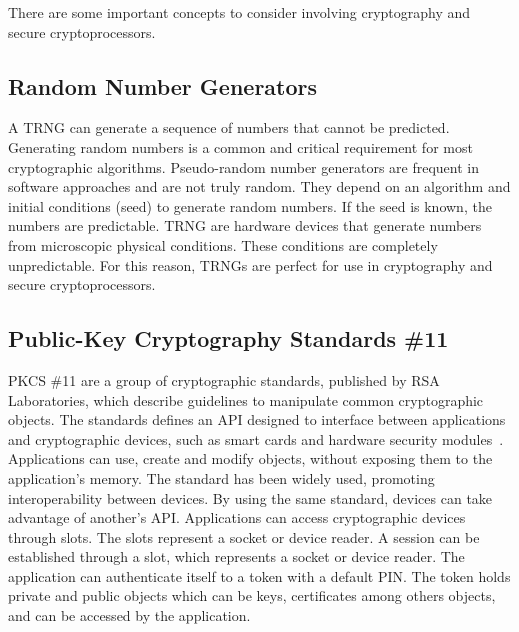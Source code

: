 There are some important concepts to consider involving cryptography and secure cryptoprocessors.

\subsection{Random Number Generators}
A \ac{TRNG} can generate a sequence of numbers that cannot be predicted. Generating random numbers is a common and critical requirement for most cryptographic algorithms. Pseudo-random number generators are frequent in software approaches and are not truly random. They depend on an algorithm and initial conditions (seed) to generate random numbers. If the seed is known, the numbers are predictable.
\ac{TRNG} are hardware devices that generate numbers from microscopic physical conditions. These conditions are completely unpredictable. For this reason, \ac{TRNG}s are perfect for use in cryptography and secure cryptoprocessors.

\subsection{Public-Key Cryptography Standards \#11}
\ac{PKCS} \#11 are a group of cryptographic standards, published by RSA Laboratories, which describe guidelines to manipulate common cryptographic objects.
The standards defines an \ac{API} designed to interface between applications and cryptographic devices, such as smart cards and hardware security modules~\cite{pkcs11analysis}. 
Applications can use, create and modify objects, without exposing them to the application's memory.
The standard has been widely used, promoting interoperability between devices. By using the same standard, devices can take advantage of another's \ac{API}.
Applications can access cryptographic devices through slots. The slots represent a socket or device reader. A session can be established through a slot, which represents a socket or device reader. The application can authenticate itself to a token with a default \ac{PIN}. The token holds private and public objects which can be keys, certificates among others objects, and can be accessed by the application.

